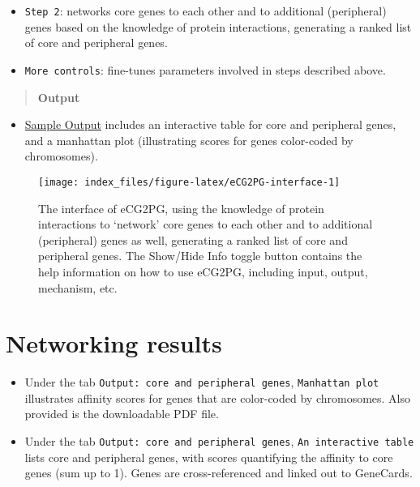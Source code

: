 \documentclass[
  oneside]{book}
\providecommand{\tightlist}{%
  \setlength{\itemsep}{0pt}\setlength{\parskip}{0pt}}
\begin{document}
\begin{itemize}
\item
  \texttt{Step\ 2}: networks core genes to each other and to additional (peripheral) genes based on the knowledge of protein interactions, generating a ranked list of core and peripheral genes.
\item
  \texttt{More\ controls}: fine-tunes parameters involved in steps described above.
\end{itemize}

\begin{quote}
\textbf{Output}
\end{quote}

\begin{itemize}
\tightlist
\item
  \href{http://www.genetictargets.com/app/examples/_tmp_RMD_eCG2PG.html}{Sample Output} includes an interactive table for core and peripheral genes, and a manhattan plot (illustrating scores for genes color-coded by chromosomes).
\end{itemize}

\begin{figure}

{\centering \texttt{[image: index\_files/figure-latex/eCG2PG-interface-1]} 

}

\caption{The interface of eCG2PG, using the knowledge of protein interactions to ‘network’ core genes to each other and to additional (peripheral) genes as well, generating a ranked list of core and peripheral genes. The Show/Hide Info toggle button contains the help information on how to use eCG2PG, including input, output, mechanism, etc.}\label{fig:eCG2PG-interface}
\end{figure}

\hypertarget{networking-results}{%
\section{Networking results}\label{networking-results}}

\begin{itemize}
\item
  Under the tab \texttt{Output:\ core\ and\ peripheral\ genes}, \texttt{Manhattan\ plot} illustrates affinity scores for genes that are color-coded by chromosomes. Also provided is the downloadable PDF file.
\item
  Under the tab \texttt{Output:\ core\ and\ peripheral\ genes}, \texttt{An\ interactive\ table} lists core and peripheral genes, with scores quantifying the affinity to core genes (sum up to 1). Genes are cross-referenced and linked out to GeneCards.
\end{itemize}
\end{document}
